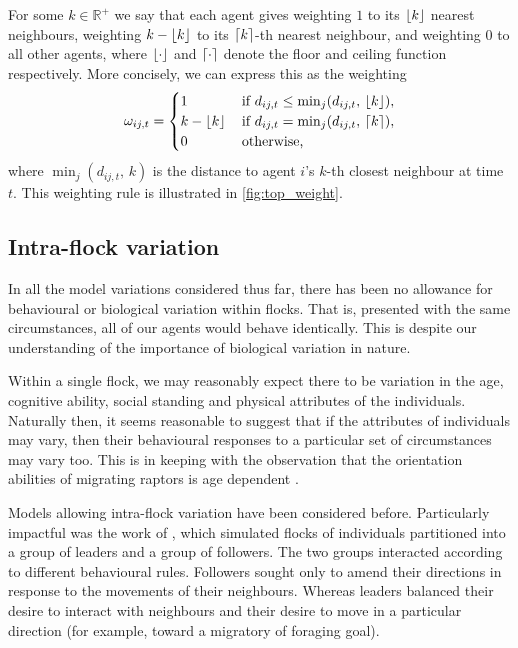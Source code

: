 For some $k\in\mathbb{R}^+$ we say that each agent gives weighting $1$ to its
$\lfloor k\rfloor$ nearest neighbours, weighting $k - \lfloor k\rfloor$ to its $\lceil k\rceil$-th
nearest neighbour, and weighting $0$ to all other agents, where $\lfloor\cdot\rfloor$
and $\lceil\cdot\rceil$ denote the floor and ceiling function respectively. More
concisely, we can express this as the weighting
\begin{equation}
  \label{eq:top_interaction}
  \omega_{ij,t} =
  \begin{cases}
    1           & \, \text{if } d_{ij, t} \leq \min_j(d_{ij,t},\, \lfloor k\rfloor), \\
    k-\lfloor k\rfloor & \, \text{if } d_{ij, t} = \min_j(d_{ij,t},\, \lceil k\rceil),     \\
    0           & \, \text{otherwise,}
  \end{cases}
\end{equation}
where $\min_j(d_{ij,t},\, k)$ is the distance to agent $i$'s $k$-th closest
neighbour at time $t$. This weighting rule is illustrated in
\cref{fig:top_weight}.

\subsection{Intra-flock variation}

In all the model variations considered thus far, there has been no allowance
for behavioural or biological variation within flocks. That is, presented with
the same circumstances, all of our agents would behave identically. This is
despite our understanding of the importance of biological variation in nature.

Within a single flock, we may reasonably expect there to be variation in the
age, cognitive ability, social standing and physical attributes of the
individuals. Naturally then, it seems reasonable to suggest that if the
attributes of individuals may vary, then their behavioural responses to a
particular set of circumstances may vary too. This is in keeping with the
observation that the orientation abilities of migrating raptors is age
dependent \parencite{thorup03}.

Models allowing intra-flock variation have been considered before. Particularly
impactful was the work of \textcite{couzin05}, which simulated flocks of
individuals partitioned into a group of leaders and a group of followers. The
two groups interacted according to different behavioural rules. Followers
sought only to amend their directions in response to the movements of their
neighbours. Whereas leaders balanced their desire to interact with neighbours
and their desire to move in a particular direction (for example, toward a
migratory of foraging goal).

